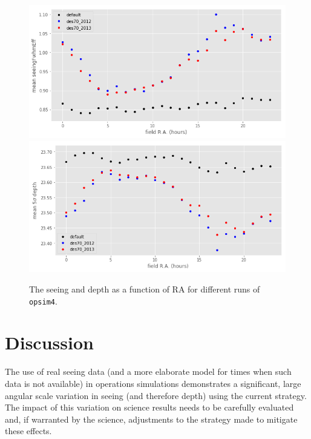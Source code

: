 \documentclass[\docopts]{\docclass}
\begin{document}
\begin{figure}
  \includegraphics[width=\columnwidth]{seeing_by_ra.png}
\endminipage\hfill
{}
  \includegraphics[width=\columnwidth]{depth_by_ra.png}
\endminipage\hfill
  \caption{The seeing and depth as a function of RA for different runs
  of \texttt{opsim4}.} 
  \label{fig:seelimra}
\end{figure}




\section{Discussion}
\label{sec:discussion}

The use of real seeing data (and a more elaborate model for
times when such data is not available) in operations simulations
demonstrates a significant, large angular scale variation in seeing
(and therefore depth) using the current strategy. The impact of this
variation on science results needs to be carefully evaluated and, if
warranted by the science, adjustments to the strategy made to mitigate
these effects.
\end{document}
